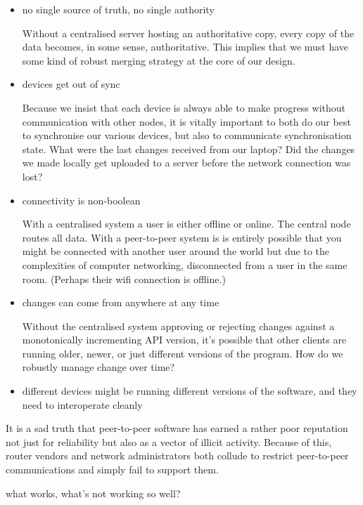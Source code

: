 \begin{itemize}
	\item no single source of truth, no single authority

	Without a centralised server hosting an authoritative copy, every copy of the data becomes, in some sense, authoritative. This implies that we must have some kind of robust merging strategy at the core of our design.
	
	\item devices get out of sync

    Because we insist that each device is always able to make progress without communication with other nodes, it is vitally important to both do our best to synchronise our various devices, but also to communicate synchronisation state. What were the last changes received from our laptop? Did the changes we made locally get uploaded to a server before the network connection was lost?  

    \item connectivity is non-boolean

    With a centralised system a user is either offline or online. The central node routes all data. With a peer-to-peer system is is entirely possible that you might be connected with another user around the world but due to the complexities of computer networking, disconnected from a user in the same room. (Perhaps their wifi connection is offline.) 

    \item changes can come from anywhere at any time

    Without the centralised system approving or rejecting changes against a monotonically incrementing API version, it's possible that other clients are running older, newer, or just different versions of the program. How do we robustly manage change over time?
    
    \item different devices might be running different versions of the software, and they need to interoperate cleanly
\end{itemize}

It is a sad truth that peer-to-peer software has earned a rather poor reputation not just for reliability but also as a vector of illicit activity. Because of this, router vendors and network administrators both collude to restrict peer-to-peer communications and simply fail to support them.

what works, what's not working so well?

